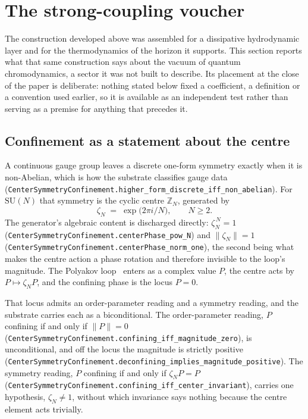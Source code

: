 \documentclass[aps,prd,nofootinbib,superscriptaddress,12pt]{revtex4-2}
\DeclareRobustCommand{\lb}{\discretionary{}{}{}}
\begin{document}
\section{The strong-coupling voucher}
\label{sec:qcd}

The construction developed above was assembled for a dissipative hydrodynamic
layer and for the thermodynamics of the horizon it supports. This section
reports what that same construction says about the vacuum of quantum
chromodynamics, a sector it was not built to describe. Its placement at the
close of the paper is deliberate: nothing stated below fixed a coefficient, a
definition or a convention used earlier, so it is available as an independent
test rather than serving as a premise for anything that precedes it.

\subsection{Confinement as a statement about the centre}

A continuous gauge group leaves a discrete one-form symmetry exactly when it is
non-Abelian, which is how the substrate classifies gauge data
(\texttt{Center\lb{}Symmetry\lb{}Confinement.\lb{}higher\_\lb{}form\_\lb{}discrete\_\lb{}iff\_\lb{}non\_\lb{}abelian}).
For $\mathrm{SU}(N)$ that symmetry is the cyclic centre $\mathbb{Z}_N$,
generated by
\begin{equation}
\label{eq:centre-phase}
\zeta_N \;=\; \exp\!\big(2\pi i / N\big), \qquad N \ge 2 .
\end{equation}
The generator's algebraic content is discharged directly:
$\zeta_N^{\,N} = 1$
(\texttt{Center\lb{}Symmetry\lb{}Confinement.\lb{}center\lb{}Phase\_\lb{}pow\_\lb{}N}) and
$\lVert \zeta_N \rVert = 1$
(\texttt{Center\lb{}Symmetry\lb{}Confinement.\lb{}center\lb{}Phase\_\lb{}norm\_\lb{}one}), the second being
what makes the centre action a phase rotation and therefore invisible to the
loop's magnitude. The Polyakov loop~\cite{Polyakov1978} enters as a complex
value $P$, the centre acts by $P \mapsto \zeta_N P$, and the confining phase is
the locus $P = 0$.

That locus admits an order-parameter reading and a symmetry reading, and the
substrate carries each as a biconditional. The order-parameter reading,
$P$ confining if and only if $\lVert P \rVert = 0$
(\texttt{Center\lb{}Symmetry\lb{}Confinement.\lb{}confining\_\lb{}iff\_\lb{}magnitude\_\lb{}zero}), is
unconditional, and off the locus the magnitude is strictly positive
(\texttt{Center\lb{}Symmetry\lb{}Confinement.\lb{}deconfining\_\lb{}implies\_\lb{}magnitude\_\lb{}positive}).
The symmetry reading, $P$ confining if and only if $\zeta_N P = P$
(\texttt{Center\lb{}Symmetry\lb{}Confinement.\lb{}confining\_\lb{}iff\_\lb{}center\_\lb{}invariant}), carries
one hypothesis, $\zeta_N \neq 1$, without which invariance says nothing because
the centre element acts trivially.
\end{document}
